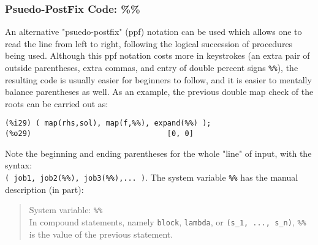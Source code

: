 \documentclass[12pt]{article}
\begin{document}
\subsubsection{Psuedo-PostFix Code: \%\%}
An alternative "psuedo-postfix" (ppf) notation can be used which allows one to read
  the line from left to right, following the logical succession of procedures being
   used.
Although this  ppf notation costs more in keystrokes (an extra pair of outside
  parentheses, extra commas, and entry of double percent signs \verb|%%|), the 
  resulting code is usually easier for beginners to follow, and it is easier to
  mentally balance parentheses as well.
As an example, the previous double map check of the roots can be carried out as:
\small
\begin{verbatim}
(%i29) ( map(rhs,sol), map(f,%%), expand(%%) );
(%o29)                               [0, 0]
\end{verbatim}
\normalsize
Note the beginning and ending parentheses for the whole "line" of input, with
  the syntax:\\
  \verb|( job1, job2(%%), job3(%%),... )|.
The system variable \verb|%%| has the manual description (in part):
\small
\begin{quote}
System variable: \verb|%%|\\ 
In compound statements, namely \verb|block|, \verb|lambda|,
  or \verb|(s_1, ..., s_n)|, \verb|%%| is the value of the previous statement.
\end{quote}
\normalsize

  
\end{document}
